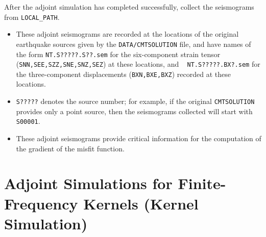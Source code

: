 \begin{enumerate}
After the adjoint simulation has completed successfully, collect the
seismograms from \texttt{LOCAL\_PATH}.
\begin{itemize}
\item These adjoint seismograms are recorded at the locations of the original
earthquake sources given by the \texttt{DATA/CMTSOLUTION} file, and
have names of the form \texttt{NT.S?????.S??.sem} for the six-component
strain tensor (\texttt{SNN,SEE,SZZ,SNE,SNZ,SEZ}) at these locations,
and ~\newline
 \texttt{NT.S?????.BX?.sem} for the three-component displacements
(\texttt{BXN,BXE,BXZ}) recorded at these locations.
\item \texttt{S?????} denotes the source number; for example, if the original
\texttt{CMTSOLUTION} provides only a point source, then the seismograms
collected will start with \texttt{S00001}.
\item These adjoint seismograms provide critical information for the computation
of the gradient of the misfit function.
\end{itemize}
\end{enumerate}



\section{Adjoint Simulations for Finite-Frequency Kernels (Kernel Simulation)}\label{sec:Adjoint-simulation-finite}

